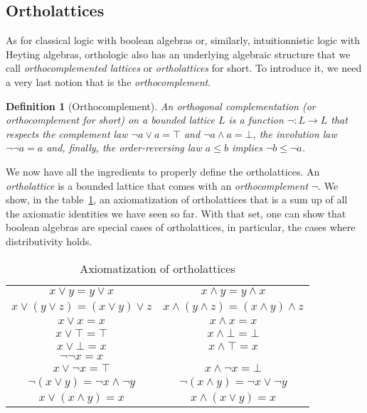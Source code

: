 \documentclass[a4paper, 11pt]{article}
\newtheorem{definition}[theorem]{Definition}
\begin{document}
    \subsection{Ortholattices}
    As for classical logic with boolean algebras or, similarly, intuitionnistic logic with Heyting 
    algebras, orthologic also has an underlying algebraic structure that we call 
    \textit{orthocomplemented lattices} or \textit{ortholattices} for short. To introduce it, we need
    a very last notion that is the \textit{orthocomplement}.
    \begin{definition}[Orthocomplement]
	    An orthogonal complementation (or orthocomplement for short) on a bounded lattice $L$ is a
	    function $\neg:L\rightarrow L$ that respects the complement law $\neg a\vee a=\top$ and
	    $\neg a\wedge a=\bot$, the involution law $\neg\neg a=a$ and, finally, the order-reversing
	    law $a\leq b$ implies $\neg b\leq\neg a$.
    \end{definition}
    We now have all the ingredients to properly define the ortholattices. An \textit{ortholattice} is a 
    bounded
    lattice that comes with an \textit{orthocomplement} $\neg$. We show, in the table~\ref{tab_ax},
    an axiomatization of ortholattices that is a sum up of all the axiomatic identities we have seen so
    far. With that set, one can show that boolean algebras are special cases of ortholattices, in 
    particular, the cases where distributivity holds.
    \begin{table}[h]
    \begin{center} 
	    \begin{tabular}{ c|c }
		    $x\vee y=y\vee x$&$x\wedge y=y\wedge x$\\
		    $x\vee(y\vee z)=(x\vee y)\vee z$&$x\wedge(y\wedge z)=(x\wedge y)\wedge z$\\
		    $x\vee x=x$&$x\wedge x=x$\\
		    $x\vee\top=\top$&$x\wedge\bot=\bot$\\
		    $x\vee\bot=x$&$x\wedge\top=x$\\
		    $\neg\neg x=x$& \\
		    $x\vee\neg x=\top$&$x\wedge\neg x=\bot$\\
		    $\neg(x\vee y)=\neg x\wedge\neg y$&$\neg(x\wedge y)=\neg x\vee\neg y$\\
		    $x\vee(x\wedge y)=x$&$x\wedge(x\vee y)=x$
	    \end{tabular}
    \end{center}
	    \caption{Axiomatization of ortholattices}
	    \label{tab_ax}
    \end{table}
\end{document}
